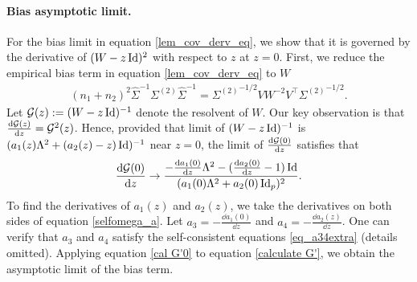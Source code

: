 \paragraph{Bias asymptotic limit.}
For the bias limit in equation \eqref{lem_cov_derv_eq}, we show that it is governed by the derivative of $(W - z\operatorname{Id})^2$ with respect to $z$ at $z = 0$.
First, we reduce the empirical bias term in equation \eqref{lem_cov_derv_eq} to $W$
\begin{align}\label{calculate G'}
	(n_1 + n_2)^2 \hat{\Sigma}^{-1}\Sigma^{(2)}\hat{\Sigma}^{-1} = {\Sigma^{(2)}}^{-1/2} V W^{-2} V^{\top} {\Sigma^{(2)}}^{-1/2}.
\end{align}
Let $\mathcal G(z):=(W-z\operatorname{Id} )^{-1}$ denote the resolvent of $W$.
Our key observation is that $\frac{\mathrm{d}{\mathcal G(z)}}{\mathrm{d} z} =  \mathcal G^2(z)$.
Hence, provided that limit of $(W - z\operatorname{Id})^{-1}$ is $(a_1(z) \Lambda^2 + (a_2(z) - z) \operatorname{Id})^{-1}$ near $z = 0$, the limit of $\frac{\mathrm{d}{\mathcal G(0)}}{\mathrm{d} z}$ satisfies that
\begin{align}\label{cal G'0}
	\frac{\mathrm{d} \mathcal G(0)}{\mathrm{d} z} \to \frac{-\frac{\mathrm{d} a_1(0)}{\mathrm{d} z}\Lambda^2 - (\frac{\mathrm{d} a_2(0)}{\mathrm{d} z} - 1)\operatorname{Id}}{(a_{1}(0)\Lambda^2 + a_{2}(0)\operatorname{Id}_p)^2}.
\end{align}
To find the derivatives of $a_1(z)$ and $a_2(z)$, we take the derivatives on both sides of equation \eqref{selfomega_a}.
Let $a_3 = - \frac{\dd a_1(0)}{\dd z}$ and $a_4 = - \frac{\dd a_2(z)}{\dd z}$.
One can verify that $a_3$ and $a_4$ satisfy the self-consistent equations \eqref{eq_a34extra} (details omitted).
Applying equation \eqref{cal G'0} to equation \eqref{calculate G'}, we obtain the asymptotic limit of the bias term.

